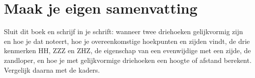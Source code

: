 \ifzelfstudie
\section*{Maak je eigen samenvatting}
Sluit dit boek en schrijf in je schrift: wanneer twee driehoeken gelijkvormig zijn en hoe je dat noteert, hoe je overeenkomstige hoekpunten en zijden vindt, de drie kenmerken HH, ZZZ en ZHZ, de eigenschap van een evenwijdige met een zijde, de zandloper, en hoe je met gelijkvormige driehoeken een hoogte of afstand berekent. Vergelijk daarna met de kaders.
\fi
